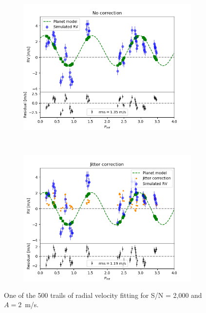 \begin{figure}[tbp]	
    \begin{subfigure}[b]{0.49\textwidth}
        \includegraphics[width=\textwidth]{./Figures/Methods/Fitting_5-Fit2.png}
    \end{subfigure}
	~
    \begin{subfigure}[b]{0.49\textwidth}
        \includegraphics[width=\textwidth]{./Figures/Methods/Fitting_5-Fit1_XY.png}
    \end{subfigure}	
    \caption[Planet recovery ($A = 2$~m/s, S/N = 2,000)]
    {One of the 500 trails of radial velocity fitting for S/N = 2,000 and $A = 2$~m/s.}
\label{fig:Planet_recovery_2000}
\end{figure}    

